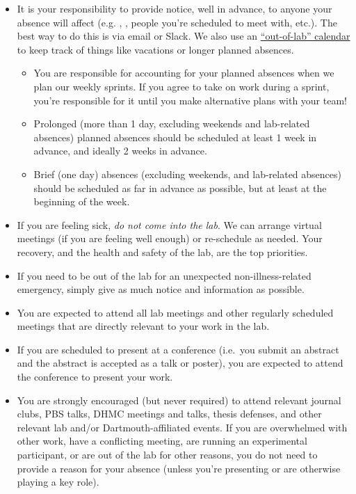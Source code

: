 \documentclass{tufte-book} %
\begin{document}
\begin{itemize}
\item It is your responsibility to provide notice, well in advance, to anyone your absence will
  affect (e.g. \director, \coordinator, people you're scheduled to
  meet with, etc.).  The best way to do this is via email or Slack.
  We also use an
  \href{https://calendar.google.com/calendar/ical/h1j06dohcg7v1g2o5tkb7ijhvs\%40group.calendar.google.com/private-239aaf8b4dc60480c90e8d7fc353e229/basic.ics}{``out-of-lab''
    calendar} to keep track of things like vacations or longer planned
  absences.
\begin{itemize}
\item You are responsible for accounting for your planned absences
  when we plan our weekly sprints.  If you agree to take on work
  during a sprint, you're responsible for it until you make
  alternative plans with your team!
\item Prolonged (more than 1 day, excluding weekends and
  lab-related absences) planned
  absences should be scheduled at least 1 week in advance, and ideally
  2 weeks in advance.
\item Brief (one day) absences (excluding weekends, and lab-related
  absences) should be scheduled as far in advance as possible, but at
  least at the beginning of the week.
\end{itemize}

\item If you are feeling sick, \textit{do not come into the lab}.  We can
  arrange virtual meetings (if you are feeling well enough) or
  re-schedule as needed.  Your recovery, and the health and safety of the lab, are the top
  priorities.

\item If you need to be out of the lab for an unexpected non-illness-related
  emergency, simply give as much notice and information as possible.

\item You are expected to attend all lab meetings and other regularly
  scheduled meetings that are directly relevant to your work in the
  lab.

\item If you are scheduled to present at a conference (i.e.\ you
  submit an abstract and the abstract is accepted as a talk or
  poster), you are expected to attend the conference to present your
  work.

\item You are strongly encouraged (but never required) to attend
  relevant journal clubs, PBS talks, DHMC
  meetings and talks, thesis defenses, and other relevant lab and/or
  Dartmouth-affiliated events.  If you are overwhelmed with other
  work, have a conflicting meeting, are running an experimental
  participant, or are out of the lab for other reasons, you do not
  need to provide a reason for your absence (unless you're presenting
  or are otherwise playing a key role).
\end{itemize}
\end{document}
